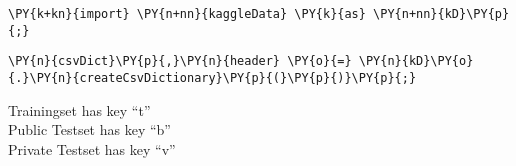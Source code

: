 
{\par%
\vspace{-1\baselineskip}%
}%
\begin{notebookcell}[]%
\begin{addmargin}[\cellleftmargin]{0em}%
{\smaller%
\par%
%
\vspace{-1\smallerfontscale}%
\begin{Verbatim}[commandchars=\\\{\}]
\PY{k+kn}{import} \PY{n+nn}{kaggleData} \PY{k}{as} \PY{n+nn}{kD}\PY{p}{;}
\end{Verbatim}
%
\par%
\vspace{-1\smallerfontscale}}%
\end{addmargin}
\end{notebookcell}



{\par%
\vspace{-1\baselineskip}%
}%
\begin{notebookcell}[]%
\begin{addmargin}[\cellleftmargin]{0em}%
{\smaller%
\par%
%
\vspace{-1\smallerfontscale}%
\begin{Verbatim}[commandchars=\\\{\}]
\PY{n}{csvDict}\PY{p}{,}\PY{n}{header} \PY{o}{=} \PY{n}{kD}\PY{o}{.}\PY{n}{createCsvDictionary}\PY{p}{(}\PY{p}{)}\PY{p}{;}
\end{Verbatim}
%
\par%
\vspace{-1\smallerfontscale}}%
\end{addmargin}
\end{notebookcell}


    Trainingset has key ``t''\\
Public Testset has key ``b''\\
Private Testset has key ``v''


